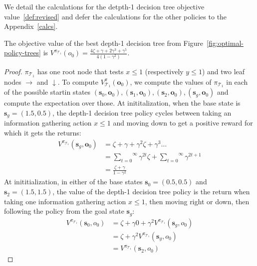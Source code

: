 We detail the calculations for the detpth-1 decision tree objective value~\ref{def:revised} and defer the calculations for the other policies to the Appendix~\ref{calcs}.

\begin{proposition} The objective value of the best depth-1 decision tree from Figure~\ref{fig:optimal-policy-trees} is $V^{\pi_{\mathcal{T}_1}}(o_0) = \frac{4\zeta + \gamma + 2\gamma^3 + \gamma^5}{4(1-\gamma^2)}$.
\end{proposition}

\begin{proof} $\pi_{\mathcal{T}_1}$ has one root node that tests $x\leq1$ (respectively $y\leq1$) and two leaf nodes $\rightarrow$ and $\downarrow$. 
To compute $V^\pi_{\mathcal{T}_1}(\boldsymbol{o}_0)$, we compute the values of $\pi_{\mathcal{T}_1}$ in each of the possible startin states $(\boldsymbol{s}_0, \boldsymbol{o}_0), (\boldsymbol{s}_1, \boldsymbol{o}_0), (\boldsymbol{s}_2, \boldsymbol{o}_0), (\boldsymbol{s}_g, \boldsymbol{o}_0)$ and compute the expectation over those. 
At inititalization, when the base state is $\boldsymbol{s}_g = (1.5, 0.5)$, the depth-1 decision tree policy cycles between taking an information gathering action $x\leq1$ and moving down to get a positive reward for which it gets the returns:
\begin{align*}
    V^{\pi_{\mathcal{T}_1}} (\boldsymbol{s}_g, \boldsymbol{o}_0) &= \zeta + \gamma + \gamma^2 \zeta + \gamma^3 \dots \\
    &= \overset{\infty}{\underset{t=0}\sum} \gamma^{2t} \zeta + \overset{\infty}{\underset{t=0}\sum} \gamma^{2t+1} \\
    &= \frac{\zeta + \gamma}{1 - \gamma^2}
\end{align*}
At inititialization, in either of the base states $\boldsymbol{s}_0=(0.5,0.5)$ and $\boldsymbol{s}_2=(1.5, 1.5)$, the value of the depth-1 decision tree policy is the return when taking one information gathering action $x\leq1$, then moving right or down, then following the policy from the goal state $\boldsymbol{s}_g$:
\begin{align*}
    V^{\pi_{\mathcal{T}_1}} (\boldsymbol{s}_0, o_0) &= \zeta + \gamma 0 + \gamma^2 V^{\pi_{\mathcal{T}_1}} (\boldsymbol{s}_g, o_0) \\
    &= \zeta + \gamma^2 V^{\pi_{\mathcal{T}_1}} (\boldsymbol{s}_g, o_0) \\
    &= V^{\pi_{\mathcal{T}_1}} (\boldsymbol{s}_2, o_0)
\end{align*}

\end{proof}
